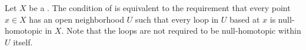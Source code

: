 \begin{proposition} \label{proposition:topological_space_is_semi_local_simply_connected_iff_every_point_has_open_neighborhood_such_that_every_loop_based_there_is_null_homotopic_in_ambient_space}
Let $X$ be a . 
The condition of  is equivalent to the requirement that every point $x \in X$ has an open neighborhood $U$ such that every loop in $U$ based at $x$ is null-homotopic in $X$. Note that the loops are not required to be null-homotopic within $U$ itself.
\end{proposition}